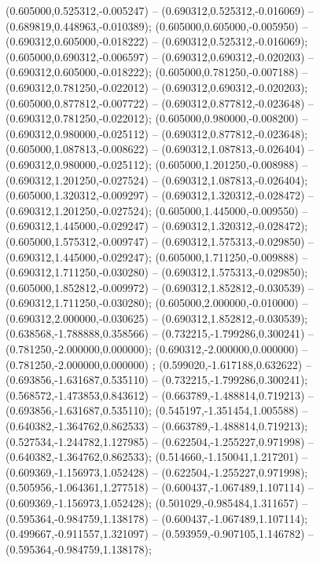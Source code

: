  (0.605000,0.525312,-0.005247) -- (0.690312,0.525312,-0.016069) -- (0.689819,0.448963,-0.010389);
 (0.605000,0.605000,-0.005950) -- (0.690312,0.605000,-0.018222) -- (0.690312,0.525312,-0.016069);
 (0.605000,0.690312,-0.006597) -- (0.690312,0.690312,-0.020203) -- (0.690312,0.605000,-0.018222);
 (0.605000,0.781250,-0.007188) -- (0.690312,0.781250,-0.022012) -- (0.690312,0.690312,-0.020203);
 (0.605000,0.877812,-0.007722) -- (0.690312,0.877812,-0.023648) -- (0.690312,0.781250,-0.022012);
 (0.605000,0.980000,-0.008200) -- (0.690312,0.980000,-0.025112) -- (0.690312,0.877812,-0.023648);
 (0.605000,1.087813,-0.008622) -- (0.690312,1.087813,-0.026404) -- (0.690312,0.980000,-0.025112);
 (0.605000,1.201250,-0.008988) -- (0.690312,1.201250,-0.027524) -- (0.690312,1.087813,-0.026404);
 (0.605000,1.320312,-0.009297) -- (0.690312,1.320312,-0.028472) -- (0.690312,1.201250,-0.027524);
 (0.605000,1.445000,-0.009550) -- (0.690312,1.445000,-0.029247) -- (0.690312,1.320312,-0.028472);
 (0.605000,1.575312,-0.009747) -- (0.690312,1.575313,-0.029850) -- (0.690312,1.445000,-0.029247);
 (0.605000,1.711250,-0.009888) -- (0.690312,1.711250,-0.030280) -- (0.690312,1.575313,-0.029850);
 (0.605000,1.852812,-0.009972) -- (0.690312,1.852812,-0.030539) -- (0.690312,1.711250,-0.030280);
 (0.605000,2.000000,-0.010000) -- (0.690312,2.000000,-0.030625) -- (0.690312,1.852812,-0.030539);
 (0.638568,-1.788888,0.358566) -- (0.732215,-1.799286,0.300241) -- (0.781250,-2.000000,0.000000);
 (0.690312,-2.000000,0.000000) -- (0.781250,-2.000000,0.000000) ;
 (0.599020,-1.617188,0.632622) -- (0.693856,-1.631687,0.535110) -- (0.732215,-1.799286,0.300241);
 (0.568572,-1.473853,0.843612) -- (0.663789,-1.488814,0.719213) -- (0.693856,-1.631687,0.535110);
 (0.545197,-1.351454,1.005588) -- (0.640382,-1.364762,0.862533) -- (0.663789,-1.488814,0.719213);
 (0.527534,-1.244782,1.127985) -- (0.622504,-1.255227,0.971998) -- (0.640382,-1.364762,0.862533);
 (0.514660,-1.150041,1.217201) -- (0.609369,-1.156973,1.052428) -- (0.622504,-1.255227,0.971998);
 (0.505956,-1.064361,1.277518) -- (0.600437,-1.067489,1.107114) -- (0.609369,-1.156973,1.052428);
 (0.501029,-0.985484,1.311657) -- (0.595364,-0.984759,1.138178) -- (0.600437,-1.067489,1.107114);
 (0.499667,-0.911557,1.321097) -- (0.593959,-0.907105,1.146782) -- (0.595364,-0.984759,1.138178);
